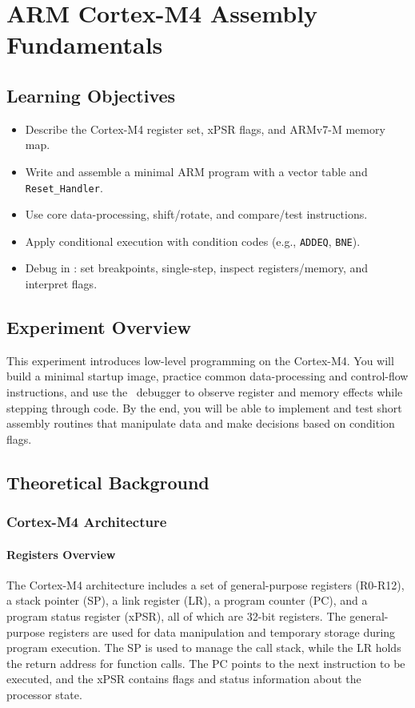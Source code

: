\chapter{ARM Cortex-M4 Assembly Fundamentals}

\section*{Learning Objectives}
\begin{itemize}[nosep]
  \item Describe the Cortex-M4 register set, xPSR flags, and ARMv7-M memory map.
  \item Write and assemble a minimal ARM program with a vector table and \texttt{Reset\_Handler}.
  \item Use core data-processing, shift/rotate, and compare/test instructions.
  \item Apply conditional execution with condition codes (e.g., \texttt{ADDEQ}, \texttt{BNE}).
  \item Debug in \keil: set breakpoints, single-step, inspect registers/memory, and interpret flags.
\end{itemize}

\section*{Experiment Overview}
This experiment introduces low-level programming on the Cortex-M4. You will build a minimal startup image, practice common data-processing and control-flow instructions, and use the \keil\ debugger to observe register and memory effects while stepping through code. By the end, you will be able to implement and test short assembly routines that manipulate data and make decisions based on condition flags.

\newpage
\tableofcontents
\newpage
\section{Theoretical Background}
\subsection{Cortex-M4 Architecture}
\subsubsection{Registers Overview}
The Cortex-M4 architecture includes a set of general-purpose registers (R0-R12), a stack pointer (SP), a link register (LR), a program counter (PC), and a program status register (xPSR), all of which are 32-bit registers. The general-purpose registers are used for data manipulation and temporary storage during program execution. The SP is used to manage the call stack, while the LR holds the return address for function calls. The PC points to the next instruction to be executed, and the xPSR contains flags and status information about the processor state.
